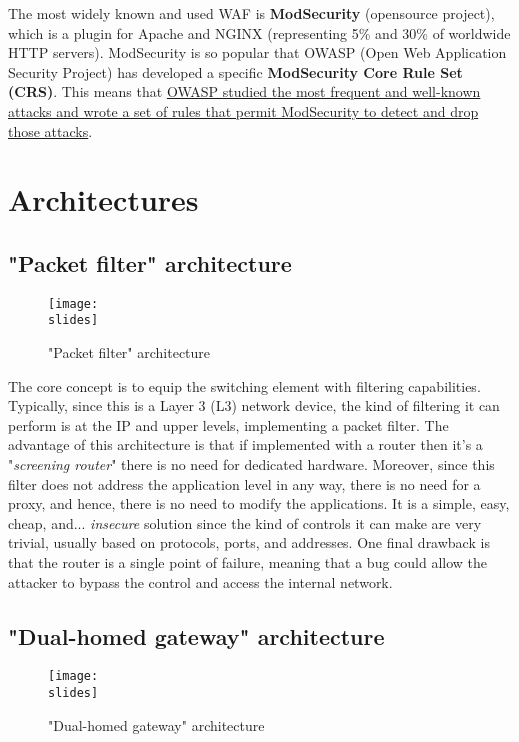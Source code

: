The most widely known and used WAF is \textbf{ModSecurity} (opensource project), which is a plugin for Apache and NGINX (representing 5\% and 30\% of worldwide HTTP servers). ModSecurity is so popular that OWASP (Open Web Application Security Project) has developed a specific \textbf{ModSecurity Core Rule Set} \textbf{(CRS)}. This means that \ul{OWASP studied the most frequent and well-known attacks and wrote a set of rules that permit ModSecurity to detect and drop those attacks}.


\section{Architectures}

\subsection{"Packet filter" architecture}

\begin{figure}[h]
    \centering
    \texttt{[image: \\slides]}
    \caption{"Packet filter" architecture}
\end{figure}

The core concept is to equip the switching element with filtering capabilities. Typically, since this is a Layer 3 (L3) network device, the kind of filtering it can perform is at the IP and upper levels, implementing a packet filter. The advantage of this architecture is that if implemented with a router then it's a "\textit{screening router}" there is no need for dedicated hardware. Moreover, since this filter does not address the application level in any way, there is no need for a proxy, and hence, there is no need to modify the applications. It is a simple, easy, cheap, and... \textit{insecure} solution since the kind of controls it can make are very trivial, usually based on protocols, ports, and addresses. One final drawback is that the router is a single point of failure, meaning that a bug could allow the attacker to bypass the control and access the internal network.

\subsection{"Dual-homed gateway" architecture}

\begin{figure}[h]
    \centering
    \texttt{[image: \\slides]}
    \caption{"Dual-homed gateway" architecture}
\end{figure}

